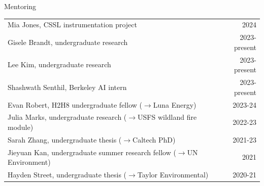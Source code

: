 \documentclass{cv}
\begin{document}
\begin{cSection}{Mentoring}
\renewcommand{\arraystretch}{1.2}
\vspace{1.6em}
\begin{tabularx}{.98\textwidth}{X r}
Mia Jones, CSSL instrumentation project & 2024 \\
Gisele Brandt, undergraduate research & 2023-present\\
Lee Kim, undergraduate research & 2023-present \\
Shashwath Senthil, Berkeley AI intern & 2023-present\\
Evan Robert, H2H8 undergraduate fellow ($\rightarrow$Luna Energy) & 2023-24\\
Julia Marks, undergraduate research ($\rightarrow$USFS wildland fire module) & 2022-23\\
Sarah Zhang, undergraduate thesis ($\rightarrow$Caltech PhD) & 2021-23\\
Jieyuan Kan, undergraduate summer research fellow ($\rightarrow$UN Environment) & 2021 \\
Hayden Street, undergraduate thesis ($\rightarrow$Taylor Environmental) & 2020-21\\
\end{tabularx}
\end{cSection}
\end{document}

